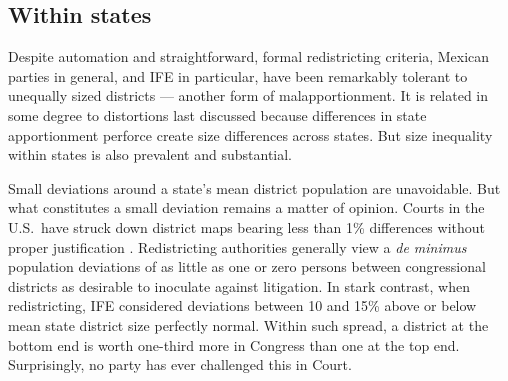 \documentclass[letter,12pt]{article}
\begin{document}


\subsection{Within states}

Despite automation and straightforward, formal redistricting criteria, Mexican parties in general, and IFE in particular, have been remarkably tolerant to unequally sized districts --- another form of malapportionment. It is related in some degree to distortions last discussed because differences in state apportionment perforce create size differences across states. But size inequality within states is also prevalent and substantial. 

Small deviations around a state's mean district population are unavoidable. But what constitutes a small deviation remains a matter of opinion. Courts in the U.S.\ have struck down district maps bearing less than 1\% differences without proper justification \citep{tuckerApportionment.1985}. Redistricting authorities generally view a \emph{de minimus} population deviations of as little as one or zero persons between congressional districts as desirable to inoculate against litigation. In stark contrast, when redistricting, IFE considered deviations between 10 and 15\% above or below mean state district size perfectly normal. Within such spread, a district at the bottom end is worth one-third more in Congress than one at the top end. Surprisingly, no party has ever challenged this in Court. 
\end{document}

